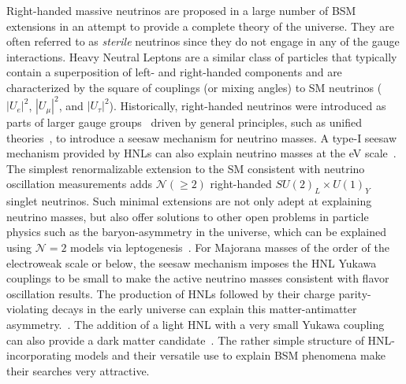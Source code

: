 Right-handed massive neutrinos are proposed in a large number of BSM extensions in an attempt to provide a complete theory of the universe. They are often referred to as \textit{sterile} neutrinos since they do not engage in any of the gauge interactions. Heavy Neutral Leptons are a similar class of particles that typically contain a superposition of left- and right-handed components and are characterized by the square of couplings (or mixing angles) to SM neutrinos ($|U_e|^2$, $|U_\mu|^2$, and $|U_\tau|^2$). Historically, right-handed neutrinos were introduced as parts of larger gauge groups~\cite{PhysRevD.11.2558} driven by general principles, such as unified theories~\cite{PhysRevD.10.275}, to introduce a seesaw mechanism for neutrino masses. A type-I seesaw mechanism provided by HNLs can also explain neutrino masses at the eV scale~\cite{PhysRevD.22.2227}. The simplest renormalizable extension to the SM consistent with neutrino oscillation measurements adds $\mathcal{N}(\geq 2)$ right-handed $SU(2)_L\times U(1)_Y$ singlet neutrinos. Such minimal extensions are not only adept at explaining neutrino masses, but also offer solutions to other open problems in particle physics such as the baryon-asymmetry in the universe, which can be explained using $\mathcal{N}=2$ models via leptogenesis~\cite{Kuzmin1985}. For Majorana masses of the order of the electroweak scale or below, the seesaw mechanism imposes the HNL Yukawa couplings to be small to make the active neutrino masses consistent with flavor oscillation results. The production of HNLs followed by their charge parity-violating decays in the early universe can explain this matter-antimatter asymmetry.~\cite{Asaka2005, Fukugita1986}. The addition of a light HNL with a very small Yukawa coupling can also provide a dark matter candidate~\cite{PhysRevLett.72.17, Asaka2005}. The rather simple structure of HNL-incorporating models and their versatile use to explain BSM phenomena make their searches very attractive.

